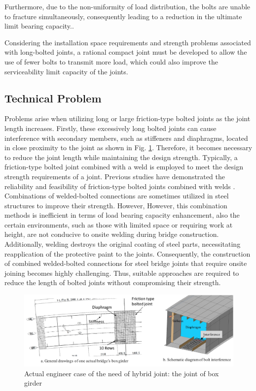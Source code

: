 Furthermore, due to the non-uniformity of load distribution, the bolts are unable to fracture simultaneously, consequently leading to a reduction in the ultimate limit bearing capacity.\cite{Takai2021BoltUnbuttoning,Peng2013FeaDimensions,peng2010}.

Considering the installation space requirements and strength problems associated with long-bolted joints, a rational compact joint must be developed to allow the use of fewer bolts to transmit more load, which could also improve the serviceability limit capacity of the joints.

\subsection{Technical Problem}
Problems arise when utilizing long or large friction-type bolted joints as the joint length increases. Firstly, these excessively long bolted joints can cause interference with secondary members, such as stiffeners and diaphragms, located in close proximity to the joint as shown in Fig. \ref{fig-boxhsbinter}. Therefore, it becomes necessary to reduce the joint length while maintaining the design strength. Typically, a friction-type bolted joint combined with a weld is employed to meet the design strength requirements of a joint. Previous studies have demonstrated the reliability and feasibility of friction-type bolted joints combined with welds \cite{solodov2021,Thomas2000,Chang2019361,KHANDEL2022107036}. Combinations of welded-bolted connections are sometimes utilized in steel structures to improve their strength. However, However, this combination methods is inefficient in terms of load bearing capacity enhancement, also the certain environments, such as those with limited space or requiring work at height, are not conducive to onsite welding during bridge construction. Additionally, welding destroys the original coating of steel parts, necessitating reapplication of the protective paint to the joints. Consequently, the construction of combined welded-bolted connections for steel bridge joints that require onsite joining becomes highly challenging. Thus, suitable approaches are required to reduce the length of bolted joints without compromising their strength.

\begin{figure}[htbp]
    \centering
    \includegraphics[width=1\linewidth]{imgs//ch2/boxhsbinter.pdf}
    \caption{Actual engineer case of the need of hybrid joint: the joint of box girder}
    \label{fig-boxhsbinter}
\end{figure}

